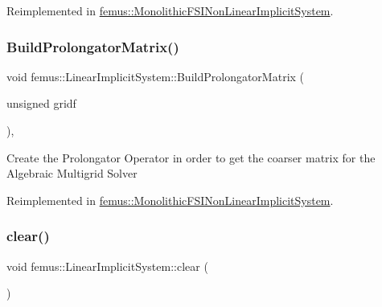Reimplemented in \mbox{\hyperlink{classfemus_1_1_monolithic_f_s_i_non_linear_implicit_system_a3012c718ac458d1f658b421460829c4b}{femus\+::\+Monolithic\+F\+S\+I\+Non\+Linear\+Implicit\+System}}.

\mbox{\label{classfemus_1_1_linear_implicit_system_a7dd4f792c3181d8b32986bbd7478e16b}} 
\subsubsection{\texorpdfstring{Build\+Prolongator\+Matrix()}{BuildProlongatorMatrix()}}
{\footnotesize\ttfamily void femus\+::\+Linear\+Implicit\+System\+::\+Build\+Prolongator\+Matrix (\begin{DoxyParamCaption}\item[{unsigned}]{gridf }\end{DoxyParamCaption})\hspace{0.3cm}{\ttfamily [protected]}, {\ttfamily [virtual]}}

Create the Prolongator Operator in order to get the coarser matrix for the Algebraic Multigrid Solver 

Reimplemented in \mbox{\hyperlink{classfemus_1_1_monolithic_f_s_i_non_linear_implicit_system_a664d35fce8341c54261d838490a35aa4}{femus\+::\+Monolithic\+F\+S\+I\+Non\+Linear\+Implicit\+System}}.

\mbox{\label{classfemus_1_1_linear_implicit_system_ace039665432e53db0c25b0efede44a76}} 
\subsubsection{\texorpdfstring{clear()}{clear()}}
{\footnotesize\ttfamily void femus\+::\+Linear\+Implicit\+System\+::clear (\begin{DoxyParamCaption}{ }\end{DoxyParamCaption})\hspace{0.3cm}{\ttfamily [virtual]}}

